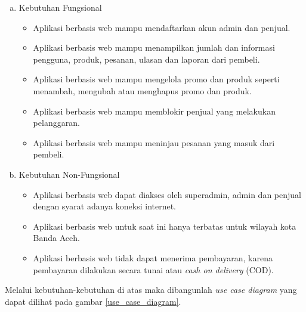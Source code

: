 \begin{enumerate}[a.]
	\item Kebutuhan Fungsional
		\begin{itemize}
		\item Aplikasi berbasis web mampu mendaftarkan akun admin dan penjual.
		\item Aplikasi berbasis web mampu menampilkan jumlah dan informasi pengguna, produk, pesanan, ulasan dan laporan dari pembeli.
		\item Aplikasi berbasis web mampu mengelola promo dan produk seperti menambah, mengubah atau menghapus promo dan produk.
		\item Aplikasi berbasis web mampu memblokir penjual yang melakukan pelanggaran.
		\item Aplikasi berbasis web mampu meninjau pesanan yang masuk dari pembeli.
		\end{itemize}
	
	\item Kebutuhan Non-Fungsional
		\begin{itemize}
		\item Aplikasi berbasis web dapat diakses oleh superadmin, admin dan penjual dengan syarat adanya koneksi internet.
		\item Aplikasi berbasis web untuk saat ini hanya terbatas untuk wilayah kota Banda Aceh.
		\item Aplikasi berbasis web tidak dapat menerima pembayaran, karena pembayaran dilakukan secara tunai atau \textit{cash on delivery} (COD).
		\end{itemize}
	\end{enumerate}

\par Melalui kebutuhan-kebutuhan di atas maka dibangunlah \textit{use case diagram} yang dapat dilihat pada gambar \ref{use_case_diagram}.

